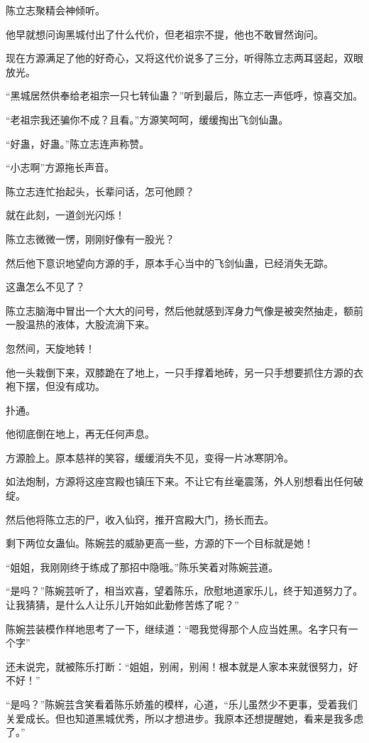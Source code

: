\begin{this_body}
陈立志聚精会神倾听。

他早就想问询黑城付出了什么代价，但老祖宗不提，他也不敢冒然询问。

现在方源满足了他的好奇心，又将这代价说多了三分，听得陈立志两耳竖起，双眼放光。

“黑城居然供奉给老祖宗一只七转仙蛊？”听到最后，陈立志一声低呼，惊喜交加。

“老祖宗我还骗你不成？且看。”方源笑呵呵，缓缓掏出飞剑仙蛊。

“好蛊，好蛊。”陈立志连声称赞。

“小志啊”方源拖长声音。

陈立志连忙抬起头，长辈问话，怎可他顾？

就在此刻，一道剑光闪烁！

陈立志微微一愣，刚刚好像有一股光？

然后他下意识地望向方源的手，原本手心当中的飞剑仙蛊，已经消失无踪。

这蛊怎么不见了？

陈立志脑海中冒出一个大大的问号，然后他就感到浑身力气像是被突然抽走，额前一股温热的液体，大股流淌下来。

忽然间，天旋地转！

他一头栽倒下来，双膝跪在了地上，一只手撑着地砖，另一只手想要抓住方源的衣袍下摆，但没有成功。

扑通。

他彻底倒在地上，再无任何声息。

方源脸上。原本慈祥的笑容，缓缓消失不见，变得一片冰寒阴冷。

如法炮制，方源将这座宫殿也镇压下来。不让它有丝毫震荡，外人别想看出任何破绽。

然后他将陈立志的尸，收入仙窍，推开宫殿大门，扬长而去。

剩下两位女蛊仙。陈婉芸的威胁更高一些，方源的下一个目标就是她！

“姐姐，我刚刚终于练成了那招中隐哦。”陈乐笑着对陈婉芸道。

“是吗？”陈婉芸听了，相当欢喜，望着陈乐，欣慰地道家乐儿，终于知道努力了。让我猜猜，是什么人让乐儿开始如此勤修苦炼了呢？”

陈婉芸装模作样地思考了一下，继续道：“嗯我觉得那个人应当姓黑。名字只有一个字”

还未说完，就被陈乐打断：“姐姐，别闹，别闹！根本就是人家本来就很努力，好不好！”

“是吗？”陈婉芸含笑看着陈乐娇羞的模样，心道，“乐儿虽然少不更事，受着我们关爱成长。但也知道黑城优秀，所以才想进步。我原本还想提醒她，看来是我多虑了。”


\end{this_body}
